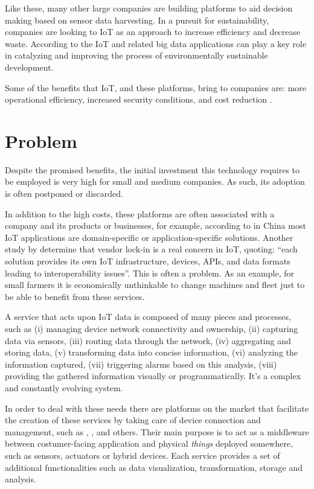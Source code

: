 Like these, many other large companies are building platforms to aid decision making based on sensor data harvesting.
In a pursuit for sustainability, companies are looking to \gls{IoT} as an approach to increase efficiency and decrease waste. According to \cite{BIBRI2018230} the \gls{IoT} and related big data applications can play a key role in catalyzing and improving the process of environmentally sustainable development.

Some of the benefits that \gls{IoT}, and these platforms, bring to companies are: more operational efficiency, increased security conditions, and cost reduction \parencite{forbes-why-iot}.

\section{Problem}
\label{sec:introduction:problem}

Despite the promised benefits, the initial investment this technology requires to be employed is very high for small and medium companies. As such, its adoption is often postponed or discarded.

In addition to the high costs, these platforms are often associated with a company and its products or businesses, for example, according to \cite{6851114} in China most \gls{IoT} applications are domain-specific or application-specific solutions. Another study by \cite{noura2019interoperability} determine that vendor lock-in is a real concern in \gls{IoT}, quoting: ``each solution provides its own IoT infrastructure, devices, APIs, and data formats leading to interoperability issues''.
This is often a problem. As an example, for small farmers it is economically unthinkable to change machines and fleet just to be able to benefit from these services.

A service that acts upon \gls{IoT} data is composed of many pieces and processes, such as (i) managing device network connectivity and ownership, (ii) capturing data via sensors, (iii) routing data through the network, (iv) aggregating and storing data, (v) transforming data into concise information, (vi)  analyzing the information captured, (vii) triggering alarms based on this analysis, (viii) providing the gathered information visually or programmatically. It's a complex and constantly evolving system.

In order to deal with these needs there are platforms on the market that facilitate the creation of these services by taking care of device connection and management, such as , ,  and others. Their main purpose is to act as a middleware between costumer-facing application and physical \textit{things} deployed somewhere, such as sensors, actuators or hybrid devices. Each service provides a set of additional functionalities such as data visualization, transformation, storage and analysis.

